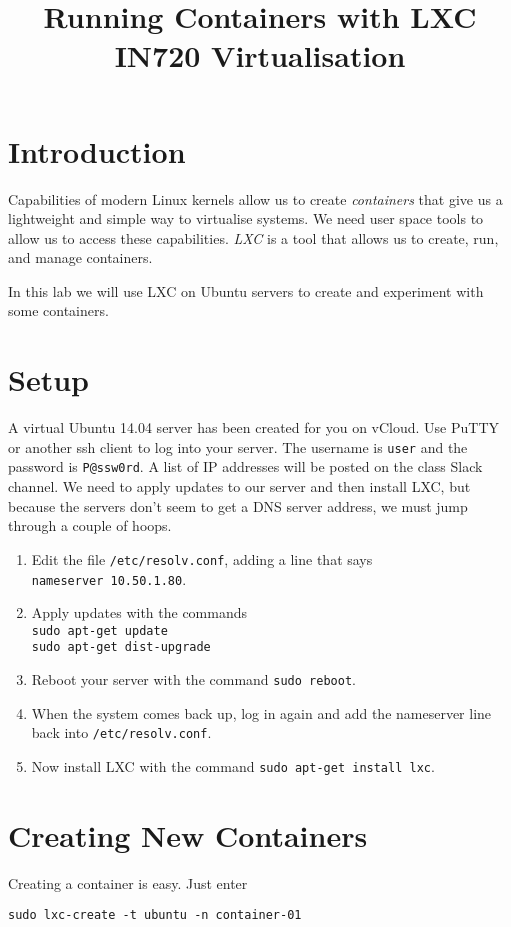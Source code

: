 \documentclass{article}
\begin{document}
\title{Running Containers with LXC\\ IN720 Virtualisation}
\date{}
\maketitle

\section*{Introduction}
Capabilities of modern Linux kernels allow us to create \emph{containers} that give us a lightweight and simple way to virtualise systems. We need user space tools to allow us to access these capabilities.  \emph{LXC} is a tool that allows us to create, run, and manage containers.

In this lab we will use LXC on Ubuntu servers to create and experiment with some containers.

\section{Setup}
A virtual Ubuntu 14.04 server has been created for you on vCloud.  Use PuTTY or another ssh client to log into your server. The username is \texttt{user} and the password is \texttt{P@ssw0rd}. A list of IP addresses will be posted on the class Slack channel. We need to apply updates to our server and then install LXC, but because the servers don't seem to get a DNS server address, we must jump through a couple of hoops.

\begin{enumerate}
	\item Edit the file \texttt{/etc/resolv.conf}, adding a line that says \\
	\texttt{nameserver 10.50.1.80}.
	\item Apply updates with the commands \\
	\texttt{sudo apt-get update} \\
	\texttt{sudo apt-get dist-upgrade}
	\item Reboot your server with the command \texttt{sudo reboot}.
	\item When the system comes back up, log in again and add the nameserver line back into 
	\texttt{/etc/resolv.conf}.
	\item Now install LXC with the command \texttt{sudo apt-get install lxc}.
\end{enumerate} 

\section{Creating New Containers}
Creating a container is easy.  Just enter
\begin{verbatim}
sudo lxc-create -t ubuntu -n container-01
\end{verbatim}
\end{document}
